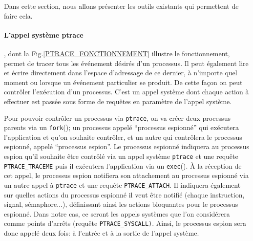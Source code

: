  Dans cette section, nous allons présenter les outils existants qui permettent
 de faire cela.
 
 \paragraph{L'appel système ptrace}\citep{AS:Interception, MARION:Interception}
 , dont la Fig.\ref{PTRACE_FONCTIONNEMENT} illustre le fonctionnement, permet de
 tracer tous les événement désirés d'un processus. Il peut également lire et
 écrire directement dans l'espace d'adressage de ce dernier, à n'importe quel
 moment ou lorsque un événement particulier se produit. De cette façon on peut
 contrôler l'exécution d'un processus. C'est un appel système dont chaque action
 à effectuer est passée sous forme de requêtes en paramètre de l'appel système.

Pour pouvoir contrôler un processus via \texttt{ptrace}, on va créer deux
processus parents via un \texttt{fork}(); un processus appelé ``processus
espionné'' qui exécutera l'application et qu'on souhaite contrôler, et un autre
qui contrôlera le processus espionné, appelé ``processus espion''. Le processus
espionné indiquera au processus espion qu'il souhaite être contrôlé via un appel
système \texttt{ptrace} et une requête \texttt{PTRACE\_TRACEME} puis il
exécutera l'application via un \texttt{exec}(). À la réception de cet appel, le
processus espion notifiera son attachement au processus espionné via un autre
appel à \texttt{ptrace} et une requête \texttt{PTRACE\_ATTACH}. Il indiquera
également sur quelles actions du processus espionné il veut être notifié (chaque
instruction, signal, sémaphore...), définissant ainsi les actions bloquantes
pour le processus espionné. Dans notre cas, ce seront les appels systèmes que
l'on considérera comme points d'arrêts (requête
\texttt{PTRACE\_SYSCALL)}. Ainsi, le processus espion sera donc appelé deux
fois: à l'entrée et à la sortie de l'appel système.

